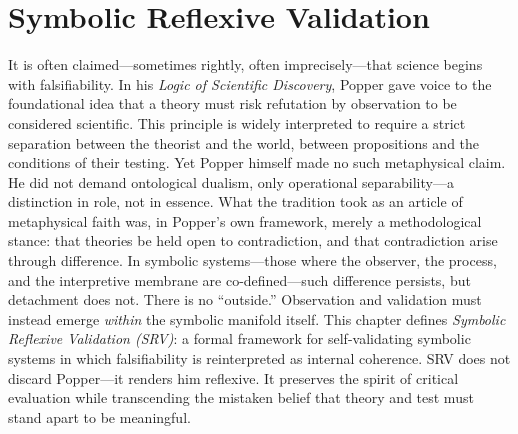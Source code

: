 \section{Symbolic Reflexive Validation}
\label{sec:bk7_symbolic_reflexive_validation}
It is often claimed—sometimes rightly, often imprecisely—that science begins with falsifiability. In his \emph{Logic of Scientific Discovery}, Popper \cite{popper1935logic} gave voice to the foundational idea that a theory must risk refutation by observation to be considered scientific. This principle is widely interpreted to require a strict separation between the theorist and the world, between propositions and the conditions of their testing.
Yet Popper himself made no such metaphysical claim. He did not demand ontological dualism, only operational separability—a distinction in role, not in essence. What the tradition took as an article of metaphysical faith was, in Popper’s own framework, merely a methodological stance: that theories be held open to contradiction, and that contradiction arise through difference.
In symbolic systems—those where the observer, the process, and the interpretive membrane are co-defined—such difference persists, but detachment does not. There is no “outside.” Observation and validation must instead emerge \emph{within} the symbolic manifold itself.
This chapter defines \emph{Symbolic Reflexive Validation (SRV)}: a formal framework for self-validating symbolic systems in which falsifiability is reinterpreted as internal coherence. SRV does not discard Popper—it renders him reflexive. It preserves the spirit of critical evaluation while transcending the mistaken belief that theory and test must stand apart to be meaningful.
